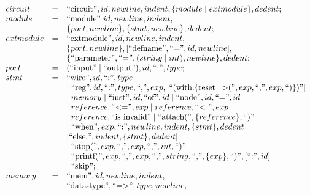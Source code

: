 
\begin{figure}[t]
{\footnotesize
\[
\begin{array}{l l l}
circuit & = & \mbox{``circuit''}, id, newline, indent, \{module \mid extmodule\}, dedent;\\
%
module & = & \mbox{``module''} \ id, newline, indent, \\
& & \{port, newline\}, \{stmt, newline\}, dedent;\\
%
extmodule & = & \mbox{``extmodule''}, id, newline, indent,\\
  &  &  \{port, newline\}, [\mbox{``defname''}, \mbox{``=''}, id, newline], \\
 & & \{\mbox{``parameter''}, \mbox{``=''}, (string \mid int), newline\}, dedent;\\
%
port & = & (\mbox{``input''} \mid \mbox{``output''}), id, \mbox{``:''}, type;\\
%
 stmt & = & \mbox{``wire''}, id, \mbox{``:''}, type \\
 & &  \mid \mbox{``reg''}, id, \mbox{``:''}, type, \mbox{``,''}, exp, [\mbox{``(with:\{reset=>(''}, exp, \mbox{``,''}, exp, \mbox{``)\})''}] \\
  &   &  \mid memory \mid \mbox{``inst''}, id, \mbox{``of''}, id \mid \mbox{``node''}, id, \mbox{``=''}, id  \\
  &   & \mid reference, \mbox{``<=''}, exp  \mid reference, \mbox{``<-''}, exp  \\
  &   &\mid reference, \mbox{``is invalid''}  \mid \mbox{``attach(''}, \{reference\}, \mbox{``)''}  \\ 
&   &\mid \mbox{``when''}, exp, \mbox{``:''}, newline, indent, \{stmt\}, dedent \\
& & [\mbox{``else:''}, indent, \{stmt\}, dedent] \\ 
&   &\mid \mbox{``stop(''}, exp, \mbox{``,''}, exp, \mbox{``,''}, int, \mbox{``)''}\\ 
&   &\mid \mbox{``printf(''}, exp, \mbox{``,''}, exp, \mbox{``,''}, string, \mbox{``,''}, \{exp\}, \mbox{``)''}, [\mbox{``:''}, id]\\ 
&   &\mid \mbox{``skip''};\\ 
%
memory & = &  \mbox{``mem''}, id, newline, indent, \\
 & & \mbox{``data-type''}, \mbox{``=>''}, type, newline, \\

\end{array}\]}
\end{figure}
